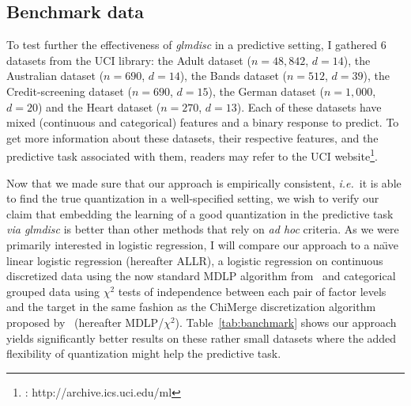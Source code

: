 \subsection{Benchmark data}

To test further the effectiveness of \textit{glmdisc} in a predictive setting, I gathered 6 datasets from the UCI library: the Adult dataset ($n=48,842$, $d=14$), the Australian dataset ($n=690$, $d=14$), the Bands dataset ($n=512$, $d=39$), the Credit-screening dataset ($n=690$, $d=15$), the German dataset ($n=1,000$, $d=20$) and the Heart dataset ($n=270$, $d=13$). Each of these datasets have mixed (continuous and categorical) features and a binary response to predict. To get more information about these datasets, their respective features, and the predictive task associated with them, readers may refer to the UCI website\footnote{\cite{Dua:2017} : http://archive.ics.uci.edu/ml}.

Now that we made sure that our approach is empirically consistent, \textit{i.e.}\ it is able to find the true quantization in a well-specified setting, we wish to verify our claim that embedding the learning of a good quantization in the predictive task \textit{via glmdisc} is better than other methods that rely on \textit{ad hoc} criteria. As we were primarily interested in logistic regression, I will compare our approach to a na\"{\i}ve linear logistic regression (hereafter ALLR), a logistic regression on continuous discretized data using the now standard MDLP algorithm from~\cite{fayyad1993multi} and categorical grouped data using $\chi^2$ tests of independence between each pair of factor levels and the target in the same fashion as the ChiMerge discretization algorithm proposed by~\cite{kerber1992chimerge} (hereafter MDLP/$\chi^2$). Table~\ref{tab:banchmark} shows our approach yields significantly better results on these rather small datasets where the added flexibility of quantization might help the predictive task.

